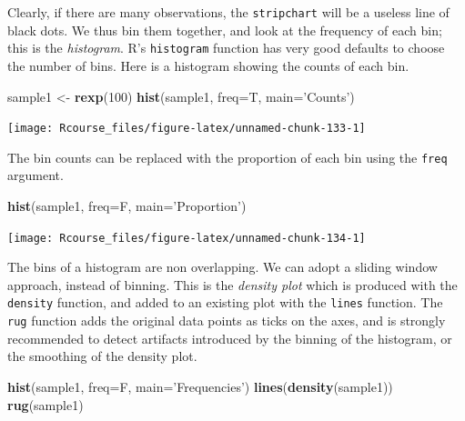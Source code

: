 \documentclass[]{book}
\newenvironment{Shaded}{\begin{snugshade}}{\end{snugshade}}
\newcommand{\KeywordTok}[1]{\textcolor[rgb]{0.13,0.29,0.53}{\textbf{#1}}}
\newcommand{\DataTypeTok}[1]{\textcolor[rgb]{0.13,0.29,0.53}{#1}}
\newcommand{\DecValTok}[1]{\textcolor[rgb]{0.00,0.00,0.81}{#1}}
\newcommand{\StringTok}[1]{\textcolor[rgb]{0.31,0.60,0.02}{#1}}
\newcommand{\NormalTok}[1]{#1}
\theoremstyle{definition}
\theoremstyle{definition}
\theoremstyle{definition}
\theoremstyle{remark}
\begin{document}
Clearly, if there are many observations, the \texttt{stripchart} will be
a useless line of black dots. We thus bin them together, and look at the
frequency of each bin; this is the \emph{histogram}. R's
\texttt{histogram} function has very good defaults to choose the number
of bins. Here is a histogram showing the counts of each bin.

\begin{Shaded}
\begin{Highlighting}[]
\NormalTok{sample1 <-}\StringTok{ }\KeywordTok{rexp}\NormalTok{(}\DecValTok{100}\NormalTok{)                            }
\KeywordTok{hist}\NormalTok{(sample1, }\DataTypeTok{freq=}\NormalTok{T, }\DataTypeTok{main=}\StringTok{'Counts'}\NormalTok{)        }
\end{Highlighting}
\end{Shaded}

\texttt{[image: Rcourse\_files/figure-latex/unnamed-chunk-133-1]}

The bin counts can be replaced with the proportion of each bin using the
\texttt{freq} argument.

\begin{Shaded}
\begin{Highlighting}[]
\KeywordTok{hist}\NormalTok{(sample1, }\DataTypeTok{freq=}\NormalTok{F, }\DataTypeTok{main=}\StringTok{'Proportion'}\NormalTok{)    }
\end{Highlighting}
\end{Shaded}

\texttt{[image: Rcourse\_files/figure-latex/unnamed-chunk-134-1]}

The bins of a histogram are non overlapping. We can adopt a sliding
window approach, instead of binning. This is the \emph{density plot}
which is produced with the \texttt{density} function, and added to an
existing plot with the \texttt{lines} function. The \texttt{rug}
function adds the original data points as ticks on the axes, and is
strongly recommended to detect artifacts introduced by the binning of
the histogram, or the smoothing of the density plot.

\begin{Shaded}
\begin{Highlighting}[]
\KeywordTok{hist}\NormalTok{(sample1, }\DataTypeTok{freq=}\NormalTok{F, }\DataTypeTok{main=}\StringTok{'Frequencies'}\NormalTok{)   }
\KeywordTok{lines}\NormalTok{(}\KeywordTok{density}\NormalTok{(sample1))                     }
\KeywordTok{rug}\NormalTok{(sample1)}
\end{Highlighting}
\end{Shaded}
\end{document}
